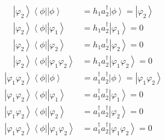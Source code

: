 \documentclass[aps,preprint]{revtex4}%
\begin{document}
\begin{align}
\left\vert \varphi_{2}\right\rangle \left\langle \phi\right\vert \left\vert
\phi\right\rangle  &  =h_{1}a_{2}^{\dagger}\left\vert \phi\right\rangle
=\left\vert \varphi_{2}\right\rangle \\
\left\vert \varphi_{2}\right\rangle \left\langle \phi\right\vert \left\vert
\varphi_{1}\right\rangle  &  =h_{1}a_{2}^{\dagger}\left\vert \varphi
_{1}\right\rangle =0\\
\left\vert \varphi_{2}\right\rangle \left\langle \phi\right\vert \left\vert
\varphi_{2}\right\rangle  &  =h_{1}a_{2}^{\dagger}\left\vert \varphi
_{2}\right\rangle =0\\
\left\vert \varphi_{2}\right\rangle \left\langle \phi\right\vert \left\vert
\varphi_{1}\varphi_{2}\right\rangle  &  =h_{1}a_{2}^{\dagger}\left\vert
\varphi_{1}\varphi_{2}\right\rangle =0
\end{align}%
\begin{align}
\left\vert \varphi_{1}\varphi_{2}\right\rangle \left\langle \phi\right\vert
\left\vert \phi\right\rangle  &  =a_{1}^{\dagger}a_{2}^{\dagger}\left\vert
\phi\right\rangle =\left\vert \varphi_{1}\varphi_{2}\right\rangle \\
\left\vert \varphi_{1}\varphi_{2}\right\rangle \left\langle \phi\right\vert
\left\vert \varphi_{1}\right\rangle  &  =a_{1}^{\dagger}a_{2}^{\dagger
}\left\vert \varphi_{1}\right\rangle =0\\
\left\vert \varphi_{1}\varphi_{2}\right\rangle \left\langle \phi\right\vert
\left\vert \varphi_{2}\right\rangle  &  =a_{1}^{\dagger}a_{2}^{\dagger
}\left\vert \varphi_{2}\right\rangle =0\\
\left\vert \varphi_{1}\varphi_{2}\right\rangle \left\langle \phi\right\vert
\left\vert \varphi_{1}\varphi_{2}\right\rangle  &  =a_{1}^{\dagger}%
a_{2}^{\dagger}\left\vert \varphi_{1}\varphi_{2}\right\rangle =0
\end{align}
\end{document}
